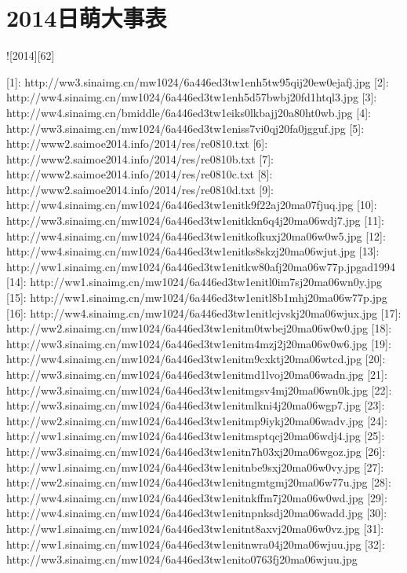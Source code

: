 \section*{2014日萌大事表}

![2014][62]

  [1]: http://ww3.sinaimg.cn/mw1024/6a446ed3tw1enh5tw95qij20ew0ejafj.jpg
  [2]: http://ww4.sinaimg.cn/mw1024/6a446ed3tw1enh5d57bwbj20fd1htql3.jpg
  [3]: http://ww4.sinaimg.cn/bmiddle/6a446ed3tw1eiks0lkbajj20a80ht0wb.jpg
  [4]: http://ww3.sinaimg.cn/mw1024/6a446ed3tw1eniss7vi0qj20fa0jgguf.jpg
  [5]: http://www2.saimoe2014.info/2014/res/re0810.txt
  [6]: http://www2.saimoe2014.info/2014/res/re0810b.txt
  [7]: http://www2.saimoe2014.info/2014/res/re0810c.txt
  [8]: http://www2.saimoe2014.info/2014/res/re0810d.txt
  [9]: http://ww4.sinaimg.cn/mw1024/6a446ed3tw1enitk9f22aj20ma07fjuq.jpg
  [10]: http://ww3.sinaimg.cn/mw1024/6a446ed3tw1enitkkn6q4j20ma06wdj7.jpg
  [11]: http://ww4.sinaimg.cn/mw1024/6a446ed3tw1enitkofkuxj20ma06w0w5.jpg
  [12]: http://ww4.sinaimg.cn/mw1024/6a446ed3tw1enitks8skzj20ma06wjut.jpg
  [13]: http://ww1.sinaimg.cn/mw1024/6a446ed3tw1enitkw80afj20ma06w77p.jpgad1994
  [14]: http://ww1.sinaimg.cn/mw1024/6a446ed3tw1enitl0im7sj20ma06wn0y.jpg
  [15]: http://ww1.sinaimg.cn/mw1024/6a446ed3tw1enitl8b1mhj20ma06w77p.jpg
  [16]: http://ww4.sinaimg.cn/mw1024/6a446ed3tw1enitlcjvskj20ma06wjux.jpg
  [17]: http://ww2.sinaimg.cn/mw1024/6a446ed3tw1enitm0twbej20ma06w0w0.jpg
  [18]: http://ww3.sinaimg.cn/mw1024/6a446ed3tw1enitm4mzj2j20ma06w0w6.jpg
  [19]: http://ww4.sinaimg.cn/mw1024/6a446ed3tw1enitm9cxktj20ma06wtcd.jpg
  [20]: http://ww3.sinaimg.cn/mw1024/6a446ed3tw1enitmd1lvoj20ma06wadn.jpg
  [21]: http://ww3.sinaimg.cn/mw1024/6a446ed3tw1enitmgsv4mj20ma06wn0k.jpg
  [22]: http://ww3.sinaimg.cn/mw1024/6a446ed3tw1enitmlkni4j20ma06wgp7.jpg
  [23]: http://ww2.sinaimg.cn/mw1024/6a446ed3tw1enitmp9iykj20ma06wadv.jpg
  [24]: http://ww1.sinaimg.cn/mw1024/6a446ed3tw1enitmsptqcj20ma06wdj4.jpg
  [25]: http://ww3.sinaimg.cn/mw1024/6a446ed3tw1enitn7h03xj20ma06wgoz.jpg
  [26]: http://ww1.sinaimg.cn/mw1024/6a446ed3tw1enitnbe9sxj20ma06w0vy.jpg
  [27]: http://ww2.sinaimg.cn/mw1024/6a446ed3tw1enitngmtgmj20ma06w77u.jpg
  [28]: http://ww4.sinaimg.cn/mw1024/6a446ed3tw1enitnkffm7j20ma06w0wd.jpg
  [29]: http://ww4.sinaimg.cn/mw1024/6a446ed3tw1enitnpnksdj20ma06wadd.jpg
  [30]: http://ww1.sinaimg.cn/mw1024/6a446ed3tw1enitnt8axvj20ma06w0vz.jpg
  [31]: http://ww1.sinaimg.cn/mw1024/6a446ed3tw1enitnwra04j20ma06wjuu.jpg
  [32]: http://ww3.sinaimg.cn/mw1024/6a446ed3tw1enito0763fj20ma06wjuu.jpg
